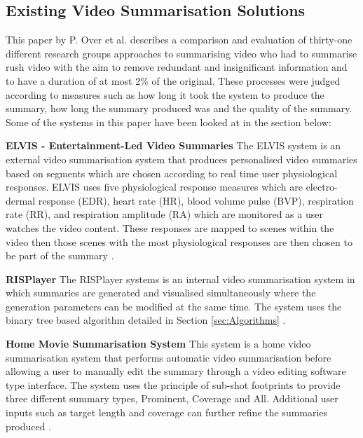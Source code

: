 \subsection{Existing Video Summarisation Solutions}

This paper by P. Over et al. \cite{BBCRushes} describes a comparison and evaluation of thirty-one
different research groups approaches to summarising video who had to summarise rush video with the aim to remove redundant and insignificant 
information and to have a duration of at most 2\% of the original. These processes were judged according to measures such as how long it took 
the system to produce the summary, how long the summary produced was and the quality of the summary. Some of the systems in this paper have 
been looked at in the section below:

\textbf{ELVIS - Entertainment-Led Video Summaries}
\newline
The ELVIS system is an external video summarisation system that produces personalised video summaries based on segments which are chosen according to real time user physiological responses. ELVIS uses five physiological response measures which are electro-dermal response (EDR), heart rate (HR), blood volume pulse (BVP), respiration rate (RR), and respiration amplitude (RA) which are monitored as a user watches the video content. These responses are mapped to scenes within the video then those scenes with the most physiological responses are then chosen to be part of the summary \cite{elvis}.

\textbf{RISPlayer}
\newline
The RISPlayer systems is an internal video summarisation system
in which summaries are generated and visualised simultaneously where the generation parameters can be modified at the same time. The system uses the binary tree based algorithm detailed in Section \ref{sec:Algorithms} \cite{risplayer}.

\textbf{Home Movie Summarisation System}
\newline
This system is a home video summarisation system that performs automatic video summarisation before allowing a user to manually edit the 
summary through a video editing software type interface. The system uses the principle of sub-shot footprints to provide three different 
summary types, Prominent, Coverage and All. Additional user inputs such as target length and coverage can further refine the 
summaries produced \cite{censor}.

